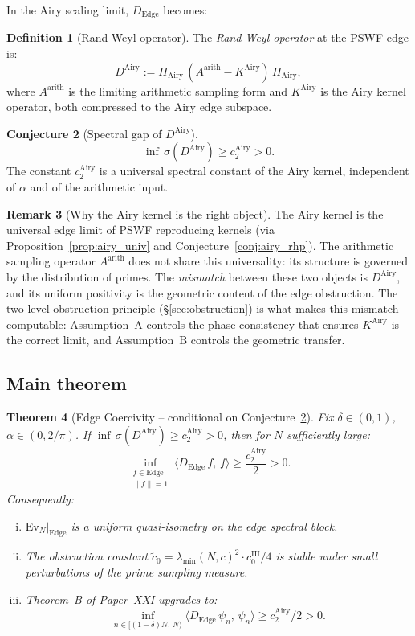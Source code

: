 \documentclass[12pt,a4paper]{amsart}
\newtheorem{theorem}{Theorem}[section]
\theoremstyle{definition}
\newtheorem{definition}[theorem]{Definition}
\newtheorem{remark}[theorem]{Remark}
\newtheorem{conjecture}[theorem]{Conjecture}
\newcommand{\Ev}{\mathrm{Ev}_N}
\newcommand{\Dedge}{D_{\mathrm{Edge}}}
\newcommand{\lmin}{\lambda_{\min}(N,c)}
\newcommand{\ip}[2]{\langle #1,\, #2\rangle}
\begin{document}
In the Airy scaling limit, $\Dedge$ becomes:

\begin{definition}[Rand-Weyl operator]\label{def:rand_weyl}
The \emph{Rand-Weyl operator} at the PSWF edge is:
\[
  D^{\mathrm{Airy}}
  := \Pi_{\mathrm{Airy}}\,
     (A^{\mathrm{arith}} - K^{\mathrm{Airy}})
     \,\Pi_{\mathrm{Airy}},
\]
where $A^{\mathrm{arith}}$ is the limiting arithmetic sampling form
and $K^{\mathrm{Airy}}$ is the Airy kernel operator,
both compressed to the Airy edge subspace.
\end{definition}

\begin{conjecture}[Spectral gap of $D^{\mathrm{Airy}}$]%
\label{conj:airy_gap}
\[
  \inf\,\sigma(D^{\mathrm{Airy}}) \ge c_2^{\mathrm{Airy}} > 0.
\]
The constant $c_2^{\mathrm{Airy}}$ is a universal spectral constant
of the Airy kernel, independent of $\alpha$ and of the arithmetic input.
\end{conjecture}

\begin{remark}[Why the Airy kernel is the right object]
The Airy kernel is the universal edge limit of PSWF reproducing kernels
(via Proposition~\ref{prop:airy_univ} and Conjecture~\ref{conj:airy_rhp}).
The arithmetic sampling operator $A^{\mathrm{arith}}$ does
not share this universality: its structure is governed by
the distribution of primes.
The \emph{mismatch} between these two objects is $D^{\mathrm{Airy}}$,
and its uniform positivity is the geometric content of the
edge obstruction.
The two-level obstruction principle (\S\ref{sec:obstruction})
is what makes this mismatch computable: Assumption~A controls
the phase consistency that ensures $K^{\mathrm{Airy}}$ is the
correct limit, and Assumption~B controls the geometric transfer.
\end{remark}

\subsection{Main theorem}

\begin{theorem}[Edge Coercivity -- conditional on
Conjecture~\ref{conj:airy_gap}]%
\label{thm:edge_coercive}
Fix $\delta \in (0,1)$, $\alpha \in (0, 2/\pi)$.
If $\inf\,\sigma(D^{\mathrm{Airy}}) \ge c_2^{\mathrm{Airy}} > 0$,
then for $N$ sufficiently large:
\[
  \inf_{\substack{f \in \mathrm{Edge}\\ \|f\|=1}}
  \ip{\Dedge\,f}{f}
  \ge \frac{c_2^{\mathrm{Airy}}}{2} > 0.
\]
Consequently:
\begin{enumerate}[(i)]
  \item $\Ev|_{\mathrm{Edge}}$ is a uniform quasi-isometry
  on the edge spectral block.
  \item The obstruction constant
  $\tilde{c}_0 = \lmin^2 \cdot c_0^{\mathrm{III}}/4$
  is stable under small perturbations of the prime sampling measure.
  \item Theorem~B of Paper~XXI upgrades to:
  \[
    \inf_{n \in [(1-\delta)N,\,N)}
    \langle \Dedge\,\psi_n,\,\psi_n\rangle
    \ge c_2^{\mathrm{Airy}}/2 > 0.
  \]
\end{enumerate}
\end{theorem}
\end{document}
